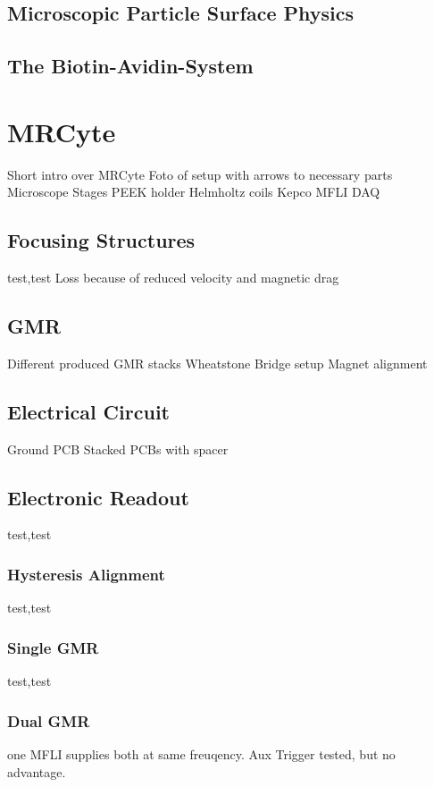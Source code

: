 \subsection{Microscopic Particle Surface Physics}

\subsection{The Biotin-Avidin-System}


\section{MRCyte}
Short intro over MRCyte
Foto of setup with arrows to necessary parts
Microscope
Stages
PEEK holder
Helmholtz coils
Kepco
MFLI
DAQ
\subsection{Focusing Structures}
test,test
Loss because of reduced velocity and magnetic drag
\subsection{GMR}
Different produced GMR stacks
Wheatstone Bridge setup
Magnet alignment
\subsection{Electrical Circuit}
Ground
PCB
Stacked PCBs with spacer
\subsection{Electronic Readout}
test,test
\subsubsection{Hysteresis Alignment}
test,test
\subsubsection{Single GMR}
test,test
\subsubsection{Dual GMR}
one MFLI supplies both at same freuqency. Aux Trigger tested, but no advantage.


